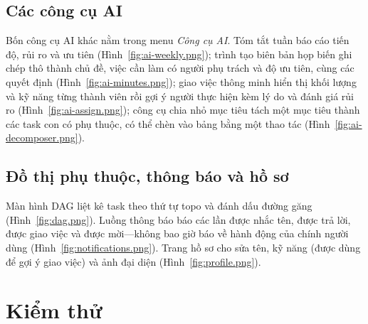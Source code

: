 \documentclass[../main.tex]{subfiles}
\begin{document}

\subsection{Các công cụ AI}
Bốn công cụ AI khác nằm trong menu \emph{Công cụ AI}. Tóm tắt tuần báo cáo tiến độ, rủi ro và ưu
tiên (Hình~\ref{fig:ai-weekly.png}); trình tạo biên bản họp biến ghi chép thô thành chủ đề, việc cần
làm có người phụ trách và độ ưu tiên, cùng các quyết định (Hình~\ref{fig:ai-minutes.png}); giao việc
thông minh hiển thị khối lượng và kỹ năng từng thành viên rồi gợi ý người thực hiện kèm lý do và đánh
giá rủi ro (Hình~\ref{fig:ai-assign.png}); công cụ chia nhỏ mục tiêu tách một mục tiêu thành các task
con có phụ thuộc, có thể chèn vào bảng bằng một thao tác (Hình~\ref{fig:ai-decomposer.png}).


\subsection{Đồ thị phụ thuộc, thông báo và hồ sơ}
Màn hình DAG liệt kê task theo thứ tự topo và đánh dấu đường găng (Hình~\ref{fig:dag.png}). Luồng
thông báo báo các lần được nhắc tên, được trả lời, được giao việc và được mời---không bao giờ báo về
hành động của chính người dùng (Hình~\ref{fig:notifications.png}). Trang hồ sơ cho sửa tên, kỹ năng
(được dùng để gợi ý giao việc) và ảnh đại diện (Hình~\ref{fig:profile.png}).


\section{Kiểm thử}
\end{document}
